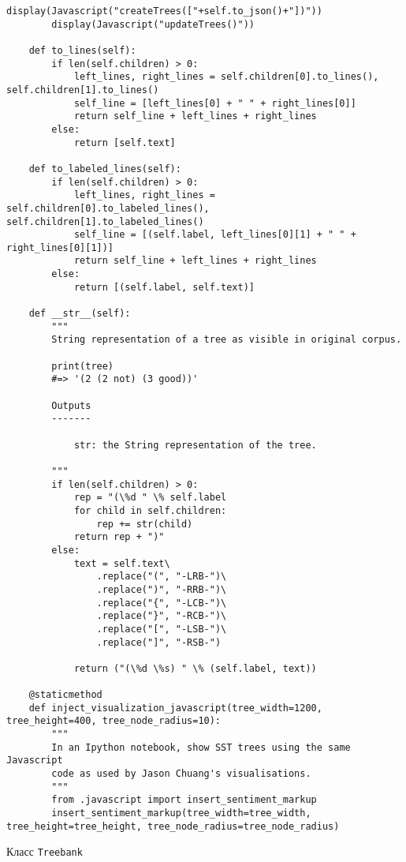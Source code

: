 \begin{lstlisting}[style=app]
        display(Javascript("createTrees(["+self.to_json()+"])"))
        display(Javascript("updateTrees()"))

    def to_lines(self):
        if len(self.children) > 0:
            left_lines, right_lines = self.children[0].to_lines(), self.children[1].to_lines()
            self_line = [left_lines[0] + " " + right_lines[0]]
            return self_line + left_lines + right_lines
        else:
            return [self.text]

    def to_labeled_lines(self):
        if len(self.children) > 0:
            left_lines, right_lines = self.children[0].to_labeled_lines(), self.children[1].to_labeled_lines()
            self_line = [(self.label, left_lines[0][1] + " " + right_lines[0][1])]
            return self_line + left_lines + right_lines
        else:
            return [(self.label, self.text)]

    def __str__(self):
        """
        String representation of a tree as visible in original corpus.

        print(tree)
        #=> '(2 (2 not) (3 good))'

        Outputs
        -------

            str: the String representation of the tree.

        """
        if len(self.children) > 0:
            rep = "(\%d " \% self.label
            for child in self.children:
                rep += str(child)
            return rep + ")"
        else:
            text = self.text\
                .replace("(", "-LRB-")\
                .replace(")", "-RRB-")\
                .replace("{", "-LCB-")\
                .replace("}", "-RCB-")\
                .replace("[", "-LSB-")\
                .replace("]", "-RSB-")

            return ("(\%d \%s) " \% (self.label, text))

    @staticmethod
    def inject_visualization_javascript(tree_width=1200, tree_height=400, tree_node_radius=10):
        """
        In an Ipython notebook, show SST trees using the same Javascript
        code as used by Jason Chuang's visualisations.
        """
        from .javascript import insert_sentiment_markup
        insert_sentiment_markup(tree_width=tree_width, tree_height=tree_height, tree_node_radius=tree_node_radius)
\end{lstlisting}


\begin{center}Класс \texttt{Treebank}\end{center}

